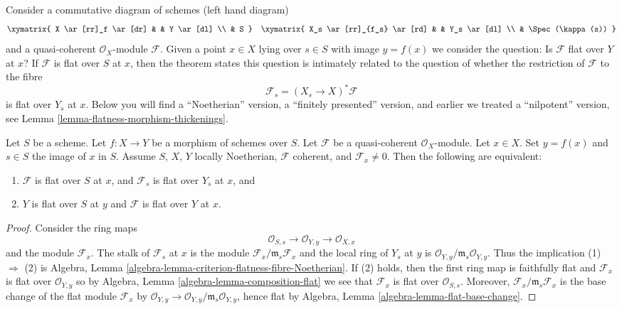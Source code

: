 \noindent
Consider a commutative diagram of schemes (left hand diagram)
$$
\xymatrix{
X \ar[rr]_f \ar[dr] & & Y \ar[dl] \\
& S
}
\quad
\xymatrix{
X_s \ar[rr]_{f_s} \ar[rd] & & Y_s \ar[dl] \\
& \Spec(\kappa(s))
}
$$
and a quasi-coherent $\mathcal{O}_X$-module $\mathcal{F}$.
Given a point $x \in X$ lying over $s \in S$ with image $y = f(x)$
we consider the question: Is $\mathcal{F}$ flat
over $Y$ at $x$? If $\mathcal{F}$ is flat over $S$ at $x$, then
the theorem states this question is intimately related to the
question of whether the restriction of $\mathcal{F}$ to the fibre
$$
\mathcal{F}_s = (X_s \to X)^*\mathcal{F}
$$
is flat over $Y_s$ at $x$. Below you will find a ``Noetherian'' version,
a ``finitely presented'' version, and earlier we treated a ``nilpotent''
version, see
Lemma \ref{lemma-flatness-morphism-thickenings}.

\begin{theorem}
\label{theorem-criterion-flatness-fibre-Noetherian}
Let $S$ be a scheme.
Let $f : X \to Y$ be a morphism of schemes over $S$.
Let $\mathcal{F}$ be a quasi-coherent $\mathcal{O}_X$-module.
Let $x \in X$. Set $y = f(x)$ and $s \in S$ the image of $x$ in $S$.
Assume $S$, $X$, $Y$ locally Noetherian,
$\mathcal{F}$ coherent, and $\mathcal{F}_x \not = 0$.
Then the following are equivalent:
\begin{enumerate}
\item $\mathcal{F}$ is flat over $S$ at $x$, and
$\mathcal{F}_s$ is flat over $Y_s$ at $x$, and
\item $Y$ is flat over $S$ at $y$ and $\mathcal{F}$ is
flat over $Y$ at $x$.
\end{enumerate}
\end{theorem}

\begin{proof}
Consider the ring maps
$$
\mathcal{O}_{S, s} \longrightarrow
\mathcal{O}_{Y, y} \longrightarrow \mathcal{O}_{X, x}
$$
and the module $\mathcal{F}_x$. The stalk of $\mathcal{F}_s$ at $x$
is the module $\mathcal{F}_x/\mathfrak m_s \mathcal{F}_x$ and
the local ring of $Y_s$ at $y$ is
$\mathcal{O}_{Y, y}/\mathfrak m_s \mathcal{O}_{Y, y}$.
Thus the implication (1) $\Rightarrow$ (2) is
Algebra, Lemma \ref{algebra-lemma-criterion-flatness-fibre-Noetherian}.
If (2) holds, then the first ring map is faithfully flat
and $\mathcal{F}_x$ is flat over $\mathcal{O}_{Y, y}$ so by
Algebra, Lemma \ref{algebra-lemma-composition-flat}
we see that $\mathcal{F}_x$ is flat over $\mathcal{O}_{S, s}$.
Moreover, $\mathcal{F}_x/\mathfrak m_s \mathcal{F}_x$ is the
base change of the flat module $\mathcal{F}_x$ by
$\mathcal{O}_{Y, y} \to \mathcal{O}_{Y, y}/\mathfrak m_s \mathcal{O}_{Y, y}$,
hence flat by
Algebra, Lemma \ref{algebra-lemma-flat-base-change}.
\end{proof}

